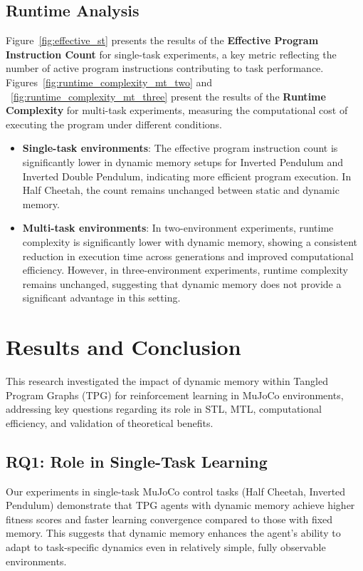 \documentclass[sigconf]{acmart}
\begin{document}
\subsection{Runtime Analysis}
Figure~\ref{fig:effective_st} presents the results of the \textbf{Effective Program Instruction Count} for single-task experiments,
a key metric reflecting the number of active program instructions contributing to task performance.
Figures~\ref{fig:runtime_complexity_mt_two} and ~\ref{fig:runtime_complexity_mt_three} present the 
results of the \textbf{Runtime Complexity} for multi-task experiments, measuring the computational cost of executing the 
program under different conditions.

\begin{itemize}
  \item \textbf{Single-task environments}: The effective program instruction count is significantly lower in dynamic memory setups for Inverted Pendulum and Inverted Double Pendulum, indicating more efficient program execution. In Half Cheetah, the count remains unchanged between static and dynamic memory.
  \item \textbf{Multi-task environments}: In two-environment experiments, runtime complexity is significantly lower with dynamic memory, showing a consistent reduction in execution time across generations and improved computational efficiency. However, in three-environment experiments, runtime complexity remains unchanged, suggesting that dynamic memory does not provide a significant advantage in this setting.
\end{itemize}

\section{Results and Conclusion}
\label{sec:results}

This research investigated the impact of dynamic memory within Tangled Program Graphs (TPG) for 
reinforcement learning in MuJoCo environments, addressing key questions regarding its role in 
STL, MTL, computational efficiency, and validation of theoretical benefits.

\subsection{RQ1: Role in Single-Task Learning} 
Our experiments in single-task MuJoCo control tasks (Half Cheetah, Inverted Pendulum) demonstrate 
that TPG agents with dynamic memory achieve higher fitness scores and faster learning convergence 
compared to those with fixed memory. This suggests that dynamic memory enhances the agent's ability 
to adapt to task-specific dynamics even in relatively simple, fully observable environments.
\end{document}
